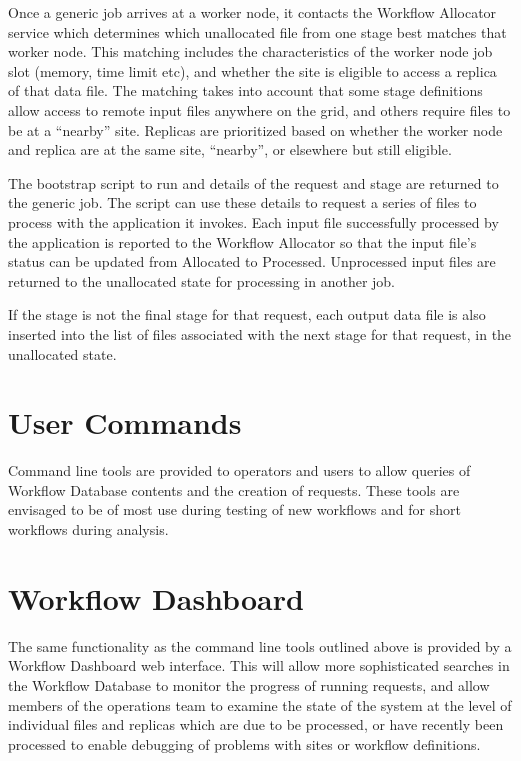 \documentclass[../main-v1.tex]{subfiles}
\begin{document}
Once a generic job arrives at a worker node, it contacts the Workflow Allocator service which determines which unallocated file from one stage best matches that worker node. This matching includes the characteristics of the worker node job slot (memory, time limit etc), and whether the site is eligible to access a replica of that data file. The matching takes into account that some stage definitions allow access to remote input files anywhere on the grid, and others require files to be at a ``nearby'' site. Replicas are prioritized based on whether the worker node and replica are at the same site, ``nearby'', or elsewhere but still eligible. 

The bootstrap script to run and details of the request and stage are returned to the generic job. The script can use these details to request a series of files to process with the application it invokes. Each input file successfully processed by the application is reported to the Workflow Allocator so that the input file’s status can be updated from Allocated to Processed. Unprocessed input files are returned to the unallocated state for processing in another job. 

If the stage is not the final stage for that request, each output data file is also inserted into the list of files associated with the next stage for that request, in the unallocated state. 

\section{User Commands}
\label{sec:flow:commands}

Command line tools are provided to operators and users to allow queries of Workflow Database contents and the creation of requests. These tools are envisaged to be of most use during testing of new workflows and for short workflows during analysis. 

\section{Workflow Dashboard}
\label{sec:flow:dashboard}

The same functionality as the command line tools outlined above is provided by a Workflow Dashboard web interface. This will allow more sophisticated searches in the Workflow Database to monitor the progress of running requests, and allow members of the operations team to examine the state of the system at the level of individual files and replicas which are due to be processed, or have recently been processed to enable debugging of problems with sites or workflow definitions.
\end{document}
